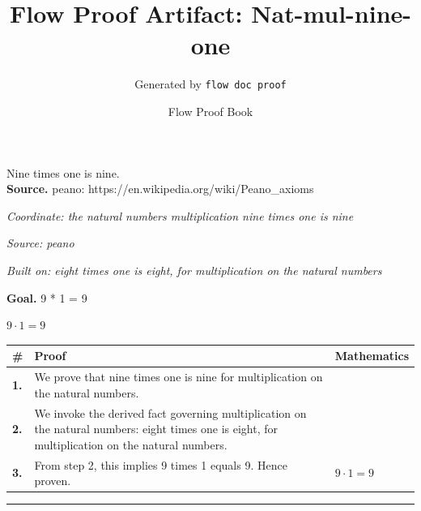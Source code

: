 \documentclass[11pt]{article}
\title{Flow Proof Artifact: Nat-mul-nine-one}
\author{Generated by \texttt{flow doc proof}}
\date{Flow Proof Book}
\theoremstyle{definition}
\begin{document}
\maketitle
Nine times one is nine.\\[0.5em]
\textbf{Source.} peano: https://en.wikipedia.org/wiki/Peano\_axioms\\[0.5em]
\bigskip
{}\par
\smallskip\noindent\textit{Coordinate: the natural numbers \cdot multiplication \cdot nine times one is nine}\par
\smallskip\noindent\textit{Source: peano}\par
\smallskip\noindent\textit{Built on: eight times one is eight, for multiplication on the natural numbers}\par
\medskip
\noindent\textbf{Goal.} 9 * 1 = 9\par
\noindent$\displaystyle 9 \cdot 1 = 9$\par
\medskip
\noindent
\begin{tabular}{@{} >{\raggedright\arraybackslash}p{} >{\raggedright\arraybackslash}p{} >{\raggedleft\arraybackslash}p{} @{}}
\textbf{\#} & \textbf{Proof} & \textbf{Mathematics} \\
\midrule
\textbf{1.} & We prove that nine times one is nine for multiplication on the natural numbers. & \\[0.45em]
\textbf{2.} & We invoke the derived fact governing multiplication on the natural numbers: eight times one is eight, for multiplication on the natural numbers. & \\[0.45em]
\textbf{3.} & From step 2, this implies 9 times 1 equals 9. Hence proven. & $\displaystyle 9 \cdot 1 = 9$ \\[0.45em]
\bottomrule
\end{tabular}
\label{thm:Nat-multiplication-nine_times_one_is_nine}
\par\medskip\hrule
\end{document}
